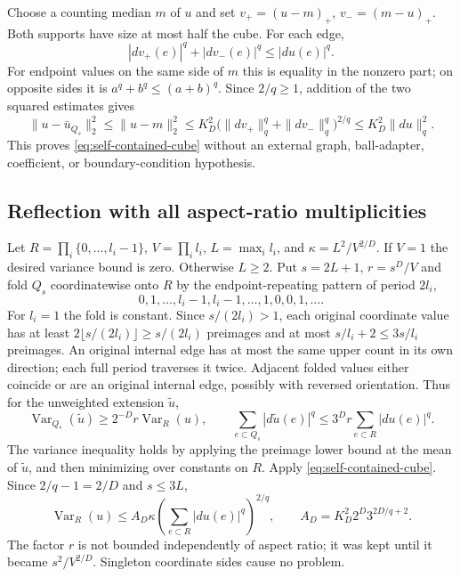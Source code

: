Choose a counting median $m$ of $u$ and set $v_+=(u-m)_+$,
$v_-=(m-u)_+$. Both supports have size at most half the cube. For each edge,
\[
 |dv_+(e)|^q+|dv_-(e)|^q\leq|du(e)|^q.
\]
For endpoint values on the same side of $m$ this is equality in the
nonzero part; on opposite sides it is $a^q+b^q\leq(a+b)^q$.
Since $2/q\geq1$, addition of the two squared estimates gives
\[
 \|u-\bar u_{Q_s}\|_2^2\leq\|u-m\|_2^2
 \leq K_D^2\big(\|dv_+\|_q^q+\|dv_-\|_q^q\big)^{2/q}
 \leq K_D^2\|du\|_q^2.
\]
This proves \eqref{eq:self-contained-cube} without an external graph,
ball-adapter, coefficient, or boundary-condition hypothesis.

\subsection{Reflection with all aspect-ratio multiplicities}
Let $R=\prod_i\{0,\ldots,l_i-1\}$, $V=\prod_i l_i$,
$L=\max_i l_i$, and $\kappa=L^2/V^{2/D}$. If $V=1$ the desired variance
bound is zero. Otherwise $L\geq2$. Put $s=2L+1$, $r=s^D/V$ and fold
$Q_s$ coordinatewise onto $R$ by the endpoint-repeating pattern of period
$2l_i$,
\[
 0,1,\ldots,l_i-1,l_i-1,\ldots,1,0,0,1,\ldots.
\]
For $l_i=1$ the fold is constant. Since $s/(2l_i)>1$, each original
coordinate value has at least $2\lfloor s/(2l_i)\rfloor\geq s/(2l_i)$
preimages and at most $s/l_i+2\leq3s/l_i$ preimages. An original internal
edge has at most the same upper count in its own direction; each full
period traverses it twice. Adjacent folded values either coincide or are
an original internal edge, possibly with reversed orientation. Thus for
the unweighted extension $\widetilde u$,
\[
 \operatorname{Var}_{Q_s}(\widetilde u)\geq2^{-D}r\operatorname{Var}_R(u),
 \qquad
 \sum_{e\subset Q_s}|d\widetilde u(e)|^q
 \leq3^D r\sum_{e\subset R}|du(e)|^q.
\]
The variance inequality holds by applying the preimage lower bound at the
mean of $\widetilde u$, and then minimizing over constants on $R$.
Apply \eqref{eq:self-contained-cube}. Since $2/q-1=2/D$ and $s\leq3L$,
\begin{equation}\label{eq:rectangle-unweighted-derived}
 \operatorname{Var}_R(u)\leq A_D\kappa
 \left(\sum_{e\subset R}|du(e)|^q\right)^{2/q},\qquad
 A_D=K_D^2 2^D 3^{2D/q+2}.
\end{equation}
The factor $r$ is not bounded independently of aspect ratio; it was kept
until it became $s^2/V^{2/D}$. Singleton coordinate sides cause no problem.

